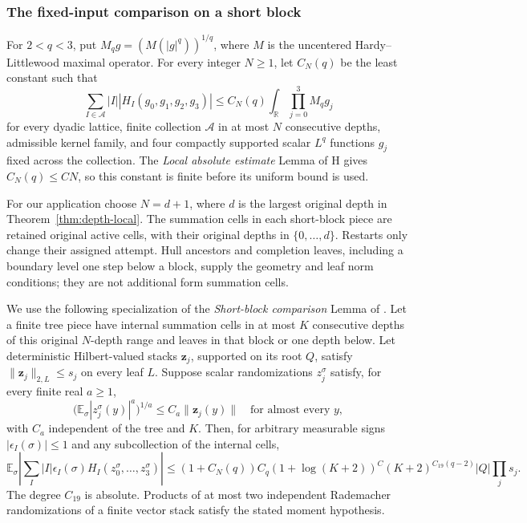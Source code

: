 \subsubsection{The fixed-input comparison on a short block}

For \(2<q<3\), put \(M_qg=(M(|g|^q))^{1/q}\), where \(M\) is
the uncentered Hardy--Littlewood maximal operator.  For every
integer \(N\ge1\), let \(C_N(q)\) be the least constant such that
\begin{equation}
 \sum_{I\in\mathcal A}|I||H_I(g_0,g_1,g_2,g_3)|
 \le C_N(q)\int_{\mathbb R}\prod_{j=0}^3M_qg_j
 \label{eq:h-fixed-local}
\end{equation}
for every dyadic lattice, finite collection \(\mathcal A\) in
at most \(N\) consecutive depths, admissible kernel family, and
four compactly supported scalar \(L^q\) functions \(g_j\) fixed
across the collection.  The \emph{Local absolute estimate} Lemma of H gives
\(C_N(q)\le CN\), so this constant is finite before its uniform
bound is used.

For our application choose \(N=d+1\), where \(d\) is the largest
original depth in Theorem~\ref{thm:depth-local}.  The summation
cells in each short-block piece are retained original active cells,
with their original depths in \(\{0,\ldots,d\}\).  Restarts only
change their assigned attempt.  Hull ancestors and completion
leaves, including a boundary level one step below a block, supply
the geometry and leaf norm conditions; they are not additional
form summation cells.

We use the following specialization of the
\emph{Short-block comparison} Lemma of \cite[Section~7]{H}.
Let a finite tree piece have internal summation cells in at most
\(K\) consecutive depths of this original \(N\)-depth range and
leaves in that block or one depth below.  Let deterministic
Hilbert-valued stacks \(\mathbf z_j\), supported on its root \(Q\),
satisfy \(\|\mathbf z_j\|_{2,L}\le s_j\) on every leaf \(L\).
Suppose scalar randomizations \(z_j^\sigma\) satisfy, for every
finite real \(a\ge1\),
\[
 \bigl(\mathbb E_\sigma|z_j^\sigma(y)|^a\bigr)^{1/a}
       \le C_a\|\mathbf z_j(y)\|
 \quad\text{for almost every }y,
\]
with \(C_a\) independent of the tree and \(K\).  Then, for
arbitrary measurable signs \(|\epsilon_I(\sigma)|\le1\) and any
subcollection of the internal cells,
\begin{equation}
 \mathbb E_\sigma\left|
   \sum_I|I|\epsilon_I(\sigma)
          H_I(z_0^\sigma,\ldots,z_3^\sigma)\right|
 \le (1+C_N(q))C_q(1+\log(K+2))^C
       (K+2)^{C_{19}(q-2)}|Q|\prod_j s_j.
 \label{eq:h-short-block}
\end{equation}
The degree \(C_{19}\) is absolute.  Products of at most two
independent Rademacher randomizations of a finite vector stack
satisfy the stated moment hypothesis.

